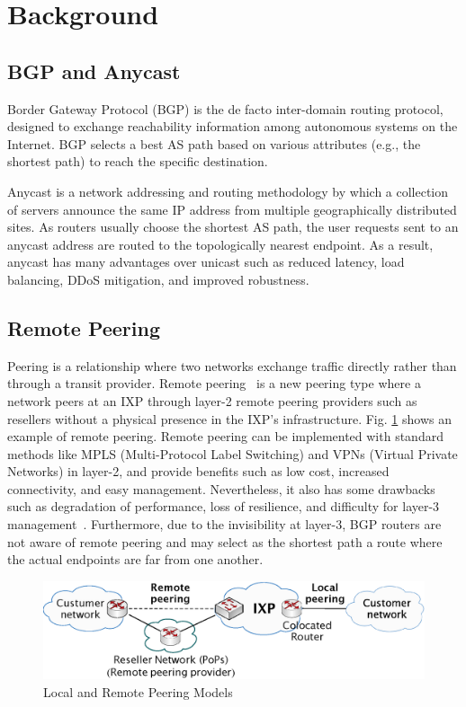 
\section{Background}
\label{sec:back}

\subsection{BGP and Anycast}

Border Gateway Protocol (BGP) \cite{rekhter2005border} is the de facto
inter-domain routing protocol, designed to exchange reachability information
among autonomous systems on the Internet. BGP selects a best AS path based on various attributes (e.g., the shortest path) to reach the specific destination.

Anycast \cite{abley2006operation} is a network addressing and routing methodology by which a collection of servers announce the same IP address from multiple geographically distributed sites. 
As routers usually choose the shortest AS path, the user requests sent to an anycast address are routed to the topologically nearest endpoint. 
As a result, anycast has many advantages over unicast such as reduced latency, load balancing, DDoS mitigation, and improved robustness.

\subsection{Remote Peering}  
Peering is a relationship where two networks exchange traffic directly rather than through a transit provider.
Remote peering~\cite{castro2014remote, Nomikos18} is a new peering type where a
network peers at an IXP through layer-2 remote peering providers such as resellers without a physical presence in the IXP's infrastructure. Fig. \ref{RP} shows an example of remote peering. 
Remote peering can be implemented with standard methods like MPLS
(Multi-Protocol Label Switching) and VPNs (Virtual Private Networks) in layer-2,
and provide benefits such as low cost, increased connectivity, and easy
management. Nevertheless, it also has some drawbacks such as degradation of
performance, loss of resilience, and difficulty for layer-3 management~\cite{Nomikos18}.
Furthermore, due to the invisibility at layer-3, BGP routers are not aware of
remote peering and may select as the shortest path a route where the actual endpoints are far from one another.

\begin{figure}[thbp]
\centerline{\includegraphics[scale=0.39]{fig/remote_peering.eps}}
\vspace{6pt}
\caption{Local and Remote Peering Models}
\label{RP}
\end{figure}
\vspace{-3pt}
